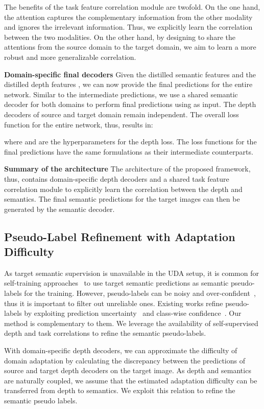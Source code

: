 \documentclass[10pt,twocolumn,letterpaper]{article}
\begin{document}
The benefits of the task feature correlation module are twofold. On the one hand, the attention captures the complementary information from the other modality and ignores the irrelevant information. Thus, we explicitly learn the correlation between the two modalities. On the other hand, by designing to share the attentions from the source domain to the target domain, we aim to learn a more robust and more generalizable correlation.


\textbf{Domain-specific final decoders}
Given the distilled semantic features  and the distilled depth features , we can now provide the final predictions for the entire network. Similar to the intermediate predictions, we use a shared semantic decoder for both domains to perform final predictions using  as input. The depth decoders of source and target domain remain independent. The overall loss function for the entire network, thus, results in:


where  and  are the hyperparameters for the depth loss. The loss functions for the final predictions have the same formulations as their intermediate counterparts.

\textbf{Summary of the architecture}
The architecture of the proposed framework, thus, contains domain-specific depth decoders and a shared task feature correlation module to explicitly learn the correlation between the depth and semantics. The final semantic predictions  for the target images can then be generated by the semantic decoder. 

\subsection{Pseudo-Label Refinement with Adaptation Difficulty}
\label{sec:refine}
As target semantic supervision is unavailable in the UDA setup, it is common for self-training approaches~\cite{zou2019confidence, Lian_2019_ICCV} to use target semantic predictions  as semantic pseudo-labels  for the training. However, pseudo-labels can be noisy and over-confident~\cite{zou2019confidence}, thus it is important to filter out unreliable ones. Existing works refine pseudo-labels by exploiting prediction uncertainty~\cite{zheng2020rectifying} and class-wise confidence~\cite{zou2019confidence}. Our method is complementary to them. We leverage the availability of self-supervised depth and task correlations to refine the semantic pseudo-labels. 

With domain-specific depth decoders, we can approximate the difficulty of domain adaptation by calculating the discrepancy between the predictions of source and target depth decoders on the target image. As depth and semantics are naturally coupled, we assume that the estimated adaptation difficulty can be transferred from depth to semantics. We exploit this relation to refine the semantic pseudo labels.
\end{document}
